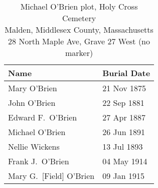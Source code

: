 \begin{table}[ht]
	\centering
	\caption{Michael O'Brien plot, Holy Cross Cemetery\cite{HolyCrossPlotMichael} \\
		Malden, Middlesex County, Massachusetts\\
		28 North Maple Ave, Grave 27 West (no marker)}
	\begin{tabular}{|l|l|}
		\hline
		\textbf{Name} & \textbf{Burial Date} \\
		\hline
		Mary O'Brien\index{O'Brien!Mary\textsuperscript{3} (1875--1875)} & 21 Nov 1875 \\
		\hline
		John O'Brien\index{O'Brien!John Joseph\textsuperscript{3} (1876--1881)} & 22 Sep 1881 \\
		\hline
		Edward F.\ O'Brien\index{O'Brien!Edward William\textsuperscript{4} (1884--1887)} & 27 Apr 1887 \\
		\hline
		Michael O'Brien\index{O'Brien!Michael\textsuperscript{2}} & 26 Jun 1891 \\
		\hline
		Nellie Wickens\index{Wickens!Nellie\textsuperscript{4}} & 13 Jul 1893 \\
		\hline
		Frank J.\ O'Brien\index{O'Brien!Francis Joseph\textsuperscript{3}} & 04 May 1914 \\
		\hline
		Mary G.\ [Field] O'Brien\index{Field!Mary}\index{O'Brien!Mary (Field)} & 09 Jan 1915 \\
		\hline
	\end{tabular}
\end{table}

